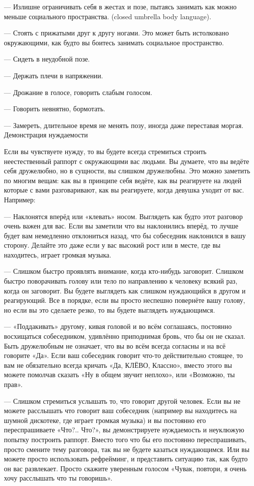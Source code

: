 --- Излишне ограничивать себя в жестах и позе, пытаясь занимать как можно меньше социального пространства. (closed umbrella body language).

--- Стоять с прижатыми друг к другу ногами. Это может быть истолковано окружающими, как будто вы боитесь занимать социальное пространство.

--- Сидеть в неудобной позе.

--- Держать плечи в напряжении.

--- Дрожание в голосе, говорить слабым голосом.

--- Говорить невнятно, бормотать.

--- Замереть, длительное время не менять позу, иногда даже переставая моргая.
Демонстрация нуждаемости

Если вы чувствуете нужду, то вы будете всегда стремиться строить неестественный раппорт с окружающими вас людьми. Вы думаете, что вы ведёте себя дружелюбно, но в сущности, вы слишком дружелюбны. Это можно заметить по многим вещам: как вы в принципе себя ведёте, как вы реагируете на людей которые с вами разговаривают, как вы реагируете, когда девушка уходит от вас. Например:

--- Наклонятся вперёд или «клевать» носом. Выглядеть как будто этот разговор очень важен для вас. Если вы заметили что вы наклонились вперёд, то лучше будет вам немедленно отклониться назад, что бы собеседник наклонился в вашу сторону. Делайте это даже если у вас высокий рост или в месте, где вы находитесь, играет громкая музыка.

--- Слишком быстро проявлять внимание, когда кто-нибудь заговорит. Слишком быстро поворачивать голову или тело по направлению к человеку всякий раз, когда он заговорит. Вы будете выглядеть как слишком нуждающийся в другом и реагирующий. Все в порядке, если вы просто неспешно повернёте вашу голову, но если вы это сделаете резко, то вы будете выглядеть нуждающимся.

--- «Поддакивать» другому, кивая головой и во всём соглашаясь, постоянно восхищаться собеседником, удивлённо приподнимая бровь, что бы он не сказал. Быть дружелюбным не означает, что вы во всём всегда согласны и на всё говорите «Да». Если ваш собеседник говорит что-то действительно стоящее, то вам не обязательно всегда кричать «Да, КЛЁВО, Классно», вместо этого вы можете помолчав сказать «Ну в общем звучит неплохо», или «Возможно, ты прав».

--- Слишком стремиться услышать то, что говорит другой человек. Если вы не можете расслышать что говорит ваш собеседник (например вы находитесь на шумной дискотеке, где играет громкая музыка) и вы постоянно его переспрашиваете «Что?.. Что?», вы демонстрируете нуждаемость и неуклюжую попытку построить раппорт. Вместо того что бы его постоянно переспрашивать, просто смените тему разговора, так вы не будете казаться нуждающимся. Или вы можете просто использовать рефрейминг, и представить ситуацию так, как будто он вас развлекает. Просто скажите уверенным голосом «Чувак, повтори, я очень хочу расслышать что ты говоришь».

